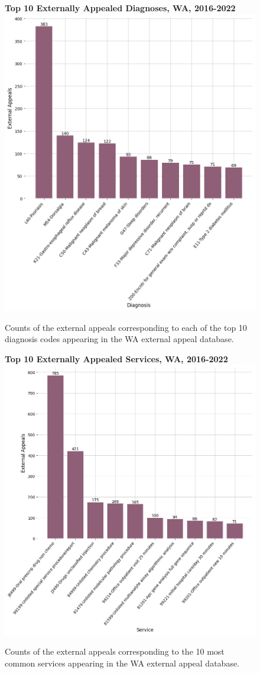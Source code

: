 \documentclass[12pt, a4paper,twoside]{report}
\theoremstyle{plain} %
\theoremstyle{definition} %
\theoremstyle{remark} %
\numberwithin{equation}{chapter}
\begin{document}
		\begin{figure}[h!]
			\centering
			\textbf{Top 10 Externally Appealed Diagnoses, WA, 2016-2022}
			\includegraphics[width=.8\textwidth]{images/wa_external_appeals/top_externally_appealed_diagnoses.png}
			\caption{Counts of the external appeals corresponding to each of the top 10 diagnosis codes appearing in the WA external appeal database.}
			\label{waexternalappealsbydiagnosis}
		\end{figure}
		
		
		\begin{figure}[h!]
			\centering
			\textbf{Top 10 Externally Appealed Services, WA, 2016-2022}
			\includegraphics[width=.8\textwidth]{images/wa_external_appeals/top_externally_appealed_treatments.png}
			\caption{Counts of the external appeals corresponding to the 10 most common services appearing in the WA external appeal database.}
			\label{waexternalappealsbyservice}
		\end{figure}
		
\end{document}
